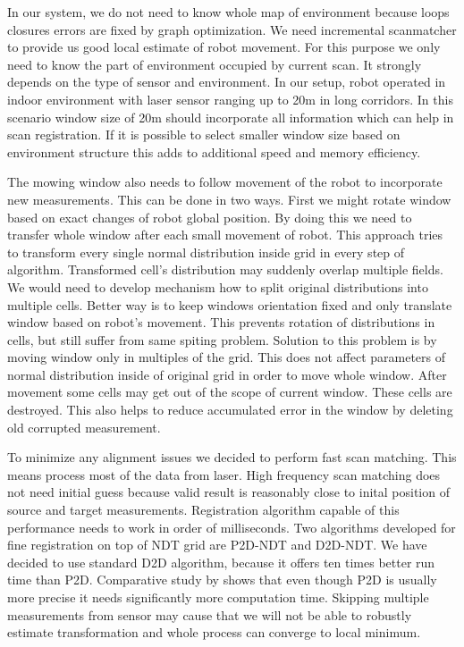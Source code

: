In our system, we do not need to know whole map of environment because loops closures errors are fixed by graph optimization. We need incremental scanmatcher to provide us good local estimate of robot movement. For this purpose we only need to know the part of environment occupied by current scan. It strongly depends on the type of sensor and environment. In our setup, robot operated in indoor environment with laser sensor ranging up to 20m in long corridors. In this scenario window size of 20m should incorporate all information which can help in scan registration. If it is possible to select smaller window size based on environment structure this adds to additional speed  and memory efficiency. 

The mowing window also needs to follow movement of the robot to incorporate new measurements. This can be done in two ways. First we might rotate window based on exact changes of robot global position. By doing this we need to transfer whole window  after each small movement of robot. This approach tries to transform every single normal distribution inside grid in every step of algorithm. Transformed cell's distribution may suddenly overlap multiple fields. We would need to develop mechanism how to split original distributions into multiple cells. Better way is to keep windows orientation fixed and only translate window based on robot's movement. This prevents rotation of distributions in cells, but still suffer from same spiting problem. Solution to this problem is by moving window only in multiples of the grid. This does not affect parameters of normal distribution inside of original grid in order to move whole window. After movement some cells may get out of the scope of current window. These cells are destroyed. This also helps to reduce accumulated error in the window by deleting old corrupted measurement. 

To minimize any alignment issues we decided to perform fast scan matching. This means process most of the data from laser. High frequency scan matching does not need initial guess because valid result is reasonably close to inital position of source and target measurements. Registration algorithm capable of this performance needs to work in order of milliseconds. Two algorithms developed for fine registration on top of \gls{NDT} grid are \gls{P2D}-\gls{NDT} and \gls{D2D}-\gls{NDT}. We have decided to use standard \gls{D2D} algorithm, because it offers ten times better run time than \gls{P2D}. Comparative study by \cite{NDTcomparative} shows that even though \gls{P2D} is usually more precise it needs significantly more computation time. Skipping multiple measurements from sensor may cause that we will not be able to robustly estimate transformation and whole process can converge to local minimum. 

